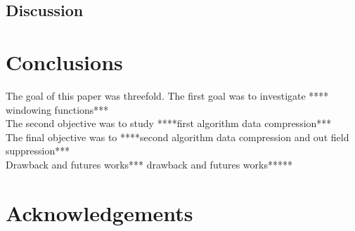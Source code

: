 \documentclass[useAMS,usenatbib]{mn2e}
\begin{document}
\subsection{Discussion}
\section{Conclusions}
The goal of this paper was threefold. The first goal was to investigate **** windowing functions***\\
The second objective  was to study ****first algorithm data compression***\\
The final objective was to ****second algorithm data compression and out field suppression*** \\
Drawback and futures works*** drawback and futures works*****
\section*{Acknowledgements}


\appendix
\end{document}
